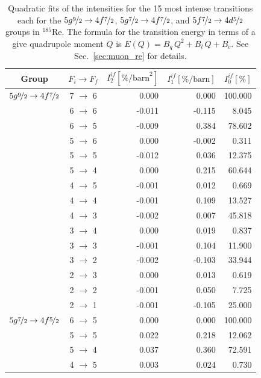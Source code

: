 \begin{table}[b]
\caption{\label{tab:re185intens}%
Quadratic fits of the intensities for the 15 most intense transitions each for the $5g\nicefrac{9}{2}\rightarrow4f\nicefrac{7}{2}$, $5g\nicefrac{7}{2}\rightarrow4f\nicefrac{7}{2}$, and $5f\nicefrac{7}{2}\rightarrow4d\nicefrac{5}{2}$ groups in $^{185}$Re. The formula for the transition energy in terms of a give quadrupole moment $Q$ is $E(Q)=B_q \, Q^2 + B_l \, Q + B_c$. See Sec.~\ref{sec:muon_re} for details.}
\centering
\begin{small}
\begin{tabular}{cc|rrr}
Group& $F_i \rightarrow F_f$ & $I_2^{if} [\%\text{/barn}^2]$ & $I_1^{if} [\%\text{/barn}]$ & $I_0^{if} [\%]$\\[1pt]\hline%
$5g\nicefrac{9}{2} \rightarrow 4f\nicefrac{7}{2}$ & 7 $\rightarrow$ 6&0.000&0.000&100.000\\
 & 6 $\rightarrow$ 6&-0.011&-0.115&8.045\\
 & 6 $\rightarrow$ 5&-0.009&0.384&78.602\\
 & 5 $\rightarrow$ 6&0.000&-0.002&0.311\\
 & 5 $\rightarrow$ 5&-0.012&0.036&12.375\\
 & 5 $\rightarrow$ 4&0.000&0.215&60.644\\
 & 4 $\rightarrow$ 5&-0.001&0.012&0.669\\
 & 4 $\rightarrow$ 4&-0.001&0.109&13.527\\
 & 4 $\rightarrow$ 3&-0.002&0.007&45.818\\
 & 3 $\rightarrow$ 4&0.000&0.019&0.837\\
 & 3 $\rightarrow$ 3&-0.001&0.104&11.900\\
 & 3 $\rightarrow$ 2&-0.002&-0.103&33.944\\
 & 2 $\rightarrow$ 3&0.000&0.013&0.619\\
 & 2 $\rightarrow$ 2&-0.001&0.050&7.725\\
 & 2 $\rightarrow$ 1&-0.001&-0.105&25.000\\[10pt]
$5g\nicefrac{7}{2} \rightarrow 4f\nicefrac{5}{2}$ & 6 $\rightarrow$ 5&0.000&0.000&100.000\\
 & 5 $\rightarrow$ 5&0.022&0.218&12.062\\
 & 5 $\rightarrow$ 4&0.037&0.360&72.591\\
 & 4 $\rightarrow$ 5&0.003&0.024&0.730\\

\end{tabular}
\end{small}
\end{table}
